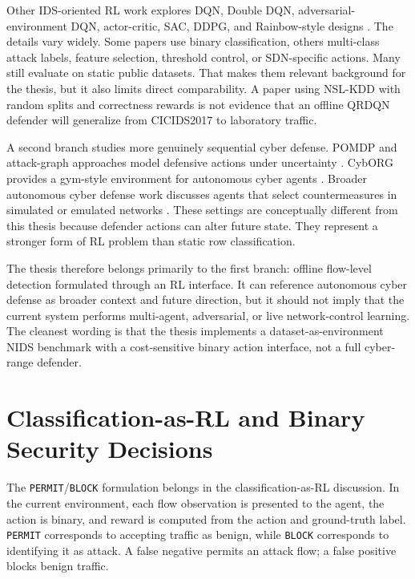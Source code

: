 Other IDS-oriented RL work explores DQN, Double DQN, adversarial-environment DQN, actor-critic, SAC, DDPG, and Rainbow-style designs \parencite{Caminero2019AERLIDS,AEDDQN2020NSLKDD,AESAC2023RLIDS,Alavizadeh2021,Hossain2025DQIDS}. The details vary widely. Some papers use binary classification, others multi-class attack labels, feature selection, threshold control, or SDN-specific actions. Many still evaluate on static public datasets. That makes them relevant background for the thesis, but it also limits direct comparability. A paper using NSL-KDD with random splits and correctness rewards is not evidence that an offline QRDQN defender will generalize from CICIDS2017 to laboratory traffic.

A second branch studies more genuinely sequential cyber defense. POMDP and attack-graph approaches model defensive actions under uncertainty \parencite{Hu2020POMDPDefense}. CybORG provides a gym-style environment for autonomous cyber agents \parencite{Standen2021CybORG}. Broader autonomous cyber defense work discusses agents that select countermeasures in simulated or emulated networks \parencite{Palmer2023_weak,CSET2023AutonomousCyberDefense}. These settings are conceptually different from this thesis because defender actions can alter future state. They represent a stronger form of RL problem than static row classification.

The thesis therefore belongs primarily to the first branch: offline flow-level detection formulated through an RL interface. It can reference autonomous cyber defense as broader context and future direction, but it should not imply that the current system performs multi-agent, adversarial, or live network-control learning. The cleanest wording is that the thesis implements a dataset-as-environment NIDS benchmark with a cost-sensitive binary action interface, not a full cyber-range defender.

\section{Classification-as-RL and Binary Security Decisions}

The \texttt{PERMIT}/\texttt{BLOCK} formulation belongs in the classification-as-RL discussion. In the current environment, each flow observation is presented to the agent, the action is binary, and reward is computed from the action and ground-truth label. \texttt{PERMIT} corresponds to accepting traffic as benign, while \texttt{BLOCK} corresponds to identifying it as attack. A false negative permits an attack flow; a false positive blocks benign traffic.

